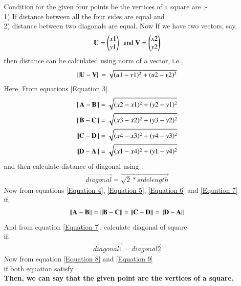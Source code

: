 \documentclass[journal,12pt,twocolumn]{IEEEtran}
\begin{document}
Condition for the given four points be the vertices of a square are ;-\\
1) If distance between all the four sides are equal and\\
2) distance between two diagonals are equal.
\vspace{0.2cm}
Now If we have two vectors, say,
\begin{align}
    \mathbf{U} = \begin{pmatrix}x1\\y1\end{pmatrix}\ ~\text{and}~
    \mathbf{V} = \begin{pmatrix}x2\\y2\end{pmatrix} 
\end{align}
then distance can be calculated using norm of a vector, i.e., 
\begin{align}
\label{Equation 3}
\lVert \mathbf{U} - \mathbf{V}\rVert = \mathbf{\sqrt{(u1-v1)^2+(u2-v2)^2}}
\end{align}
Here, From equations  
    \eqref{Equation 3}
\begin{align}
\label{Equation 4}
\lVert \mathbf{A} - \mathbf{B}\rVert =\mathbf{\sqrt{(x2-x1)^2+(y2-y1)^2}}\\
\label{Equation 5}
\lVert \mathbf{B} - \mathbf{C}\rVert =\mathbf{\sqrt{(x3-x2)^2+(y3-y2)^2}}\\
\label{Equation 6}
\lVert \mathbf{C} - \mathbf{D}\rVert =\mathbf{\sqrt{(x4-x3)^2+(y4-y3)^2}}\\
\label{Equation 7}
\lVert \mathbf{D} - \mathbf{A}\rVert =\mathbf{\sqrt{(x1-x4)^2+(y1-y4)^2}}
\end{align}
and then calculate distance of diagonal using 
\begin{align}
\label{Equation 7}
\vec{diagonal}=\vec{\sqrt{2}* side length}
\end{align}
Now from equations 
\eqref{Equation 4}, \eqref{Equation 5}, \eqref{Equation 6} and \eqref{Equation 7}\\
if,
\begin{align}
\label{Equation 8}
\lVert \mathbf{A} - \mathbf{B}\rVert=\lVert \mathbf{B} - \mathbf{C}\rVert=\lVert \mathbf{C} - \mathbf{D}\rVert=\lVert \mathbf{D} - \mathbf{A}\rVert
\end{align}
And from equation 
\eqref{Equation 7}, calculate diagonal of square\\
if,
\begin{align}
\label{Equation 9}
\vec{diagonal1} = \vec{diagonal2}
\end{align}
Now from equation 
\eqref{Equation 8} and \eqref{Equation 9}\\
if both equation satisfy\\
\textbf{Then, we can say that the given point are the vertices of a square.}
\\
\end{document}
